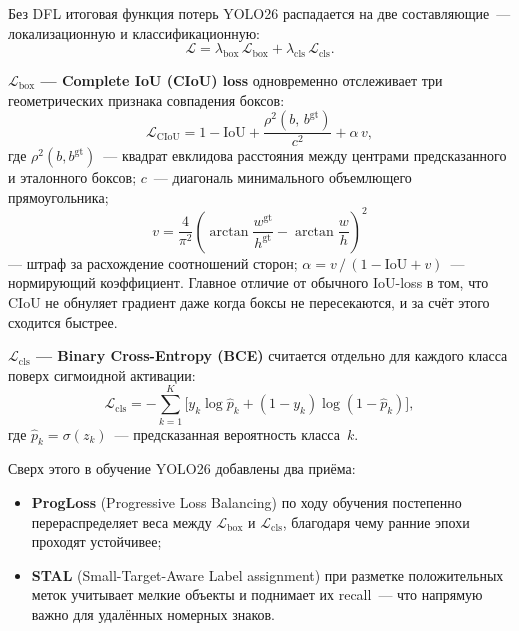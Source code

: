\documentclass[10pt,a4paper]{report}
\numberwithin{equation}{chapter}
\numberwithin{figure}{chapter}
\numberwithin{table}{chapter}
\begin{document}
Без DFL итоговая функция потерь YOLO26 распадается на две
составляющие~--- локализационную и классификационную:
\begin{equation}
  \mathcal{L} = \lambda_{\mathrm{box}}\,\mathcal{L}_{\mathrm{box}}
              + \lambda_{\mathrm{cls}}\,\mathcal{L}_{\mathrm{cls}}.
\end{equation}

\textbf{$\mathcal{L}_{\mathrm{box}}$ --- Complete IoU (CIoU) loss}
одновременно отслеживает три геометрических признака совпадения боксов:
\begin{equation}
  \mathcal{L}_{\mathrm{CIoU}} = 1 - \mathrm{IoU}
    + \frac{\rho^2(b,\,b^{\mathrm{gt}})}{c^2}
    + \alpha\,v,
\end{equation}
где $\rho^2(b, b^{\mathrm{gt}})$~--- квадрат евклидова расстояния между
центрами предсказанного и эталонного боксов; $c$~--- диагональ
минимального объемлющего прямоугольника;
\begin{equation}
  v = \frac{4}{\pi^2}\!\left(\arctan\frac{w^{\mathrm{gt}}}{h^{\mathrm{gt}}}
    - \arctan\frac{w}{h}\right)^{\!2}
\end{equation}
--- штраф за расхождение соотношений сторон;
$\alpha = v\,/\,(1 - \mathrm{IoU} + v)$~--- нормирующий коэффициент.
Главное отличие от обычного IoU-loss в том, что CIoU не обнуляет
градиент даже когда боксы не пересекаются, и за счёт этого сходится
быстрее.

\textbf{$\mathcal{L}_{\mathrm{cls}}$ --- Binary Cross-Entropy (BCE)}
считается отдельно для каждого класса поверх сигмоидной активации:
\begin{equation}
  \mathcal{L}_{\mathrm{cls}} =
  -\sum_{k=1}^{K}\bigl[y_k\log\hat{p}_k
    + (1-y_k)\log(1-\hat{p}_k)\bigr],
\end{equation}
где $\hat{p}_k = \sigma(z_k)$~--- предсказанная вероятность класса~$k$.

Сверх этого в обучение YOLO26 добавлены два приёма:
\begin{itemize}[nosep]
  \item \textbf{ProgLoss} (Progressive Loss Balancing) по ходу обучения
    постепенно перераспределяет веса между $\mathcal{L}_{\mathrm{box}}$ и
    $\mathcal{L}_{\mathrm{cls}}$, благодаря чему ранние эпохи проходят
    устойчивее;
  \item \textbf{STAL} (Small-Target-Aware Label assignment) при разметке
    положительных меток учитывает мелкие объекты и поднимает их
    recall~--- что напрямую важно для удалённых номерных знаков.
\end{itemize}
\end{document}
